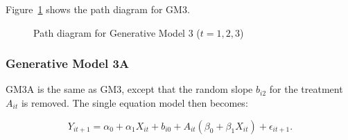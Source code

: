 \documentclass[
  12pt,
  a4paper,
]{article}
\begin{document}
Figure~\ref{fig-GM3_path} shows the path diagram for GM3.

\begin{figure}[H]

\caption{\label{fig-GM3_path}Path diagram for Generative Model 3
(\(t = 1, 2, 3\))}


\end{figure}%

\subsubsection{Generative Model 3A}\label{generative-model-3a}

GM3A is the same as GM3, except that the random slope \(b_{i2}\) for the
treatment \(A_{it}\) is removed. The single equation model then becomes:

\[
Y_{it+1} = \alpha_0 + \alpha_1 X_{it} + b_{i0} + A_{it} (\beta_0 + \beta_1 X_{it}) + \epsilon_{it+1}.
\]
\end{document}
